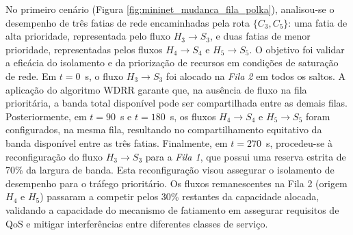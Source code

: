 No primeiro cenário (Figura \ref{fig:mininet_mudanca_fila_polka}), analisou-se o desempenho de três fatias de rede encaminhadas pela rota $\{C_3, C_5\}$: uma fatia de alta prioridade, representada pelo fluxo $H_3 \rightarrow S_3$, e duas fatias de menor prioridade, representadas pelos fluxos $H_4 \rightarrow S_4$ e $H_5 \rightarrow S_5$. O objetivo foi validar a eficácia do isolamento e da priorização de recursos em condições de saturação de rede.
%
Em $t=0$~s, o fluxo $H_3 \rightarrow S_3$ foi alocado na \textit{Fila 2} em todos os saltos. 
A aplicação do algoritmo WDRR garante que, na ausência de fluxo na fila prioritária, a banda total disponível pode ser compartilhada entre as demais filas.
Posteriormente, em $t=90$~s e $t=180$~s, os fluxos $H_4 \rightarrow S_4$ e $H_5 \rightarrow S_5$ foram configurados, na mesma fila, resultando no compartilhamento equitativo da banda disponível entre as três fatias. 
%
Finalmente, em $t=270$~s, procedeu-se à reconfiguração do fluxo $H_3 \rightarrow S_3$ para a \textit{Fila 1}, que possui uma reserva estrita de 70\% da largura de banda. Esta reconfiguração visou assegurar o isolamento de desempenho para o tráfego prioritário. Os fluxos remanescentes na Fila 2 (origem $H_4$ e $H_5$) passaram a competir pelos 30\% restantes da capacidade alocada, validando a capacidade do mecanismo de fatiamento em assegurar requisitos de QoS e mitigar interferências entre diferentes classes de serviço. 


